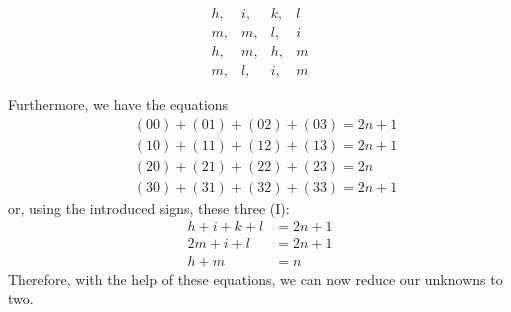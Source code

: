 \documentclass[twoside,12pt, showframe]{memoir}
\begin{document}
\[\begin{array}{llll}
h,&  i,& k,& l \\
m,& m,& l,& i \\
h,& m,& h,& m \\
m,& l,&  i,&  m
\end{array}\]

Furthermore, we have the equations
\[\begin{aligned}
& (00)+(01)+(02)+(03)=2 n+1 \\
& (10)+(11)+(12)+(13)=2 n+1 \\
& (20)+(21)+(22)+(23)=2 n \\
& (30)+(31)+(32)+(33)=2 n+1
\end{aligned}\]
or, using the introduced signs, these three (I):
\[\begin{aligned}
h+i+k+l & =2 n+1 \\
2 m+i+l & =2 n+1 \\
h+m & =n
\end{aligned}\]
Therefore, with the help of these equations, we can now reduce our unknowns to two.
%
\end{document}

